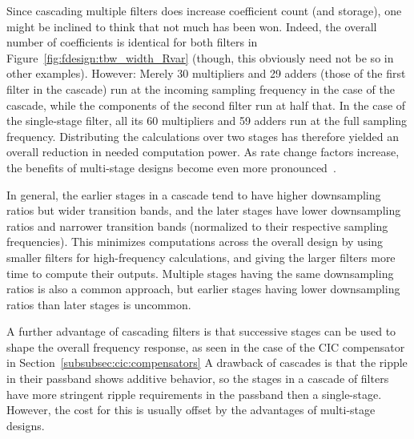 Since  cascading  multiple  filters   does  increase  coefficient  count  (and
storage), one might  be inclined to think that not  much has been won. Indeed,
the  overall  number  of  coefficients   is  identical  for  both  filters  in
Figure~\ref{fig:fdesign:tbw_width_Rvar}  (though, this  obviously need  not be
so  in  other  examples). However: Merely \num{30}  multipliers  and  \num{29}
adders  (those  of the  first  filter  in the  cascade)  run  at the  incoming
sampling  frequency in  the  case  of the  cascade,  while  the components  of
the  second  filter  run at  half  that.   In  the  case of  the  single-stage
filter,  all  its  \num{60}  multipliers   and  \num{59}  adders  run  at  the
full  sampling frequency. Distributing  the calculations  over two  stages has
therefore yielded  an overall reduction  in needed computation  power. As rate
change  factors increase,  the  benefits of  multi-stage  designs become  even
more pronounced~\cite{crochiere-rabiner:multirate-dsp}. 

In general, the  earlier stages in a cascade tend  to have higher downsampling
ratios  but  wider   transition  bands,  and  the  later   stages  have  lower
downsampling  ratios  and  narrower  transition  bands  (normalized  to  their
respective  sampling frequencies).   This  minimizes  computations across  the
overall design by  using smaller filters for  high-frequency calculations, and
giving the larger filters more  time to compute their outputs. Multiple stages
having the  same downsampling ratios  is also  a common approach,  but earlier
stages having lower downsampling ratios than later stages is uncommon.

A further advantage of cascading filters is that successive stages can be used
to  shape the  overall frequency  response, as  seen in  the case  of the  CIC
compensator in Section~\ref{subsubsec:cic:compensators} A drawback of cascades
is that the ripple in their passband shows additive behavior, so the stages in
a cascade of  filters have more stringent ripple requirements  in the passband
then  a single-stage. However,  the cost  for this  is usually  offset by  the
advantages of multi-stage designs.

